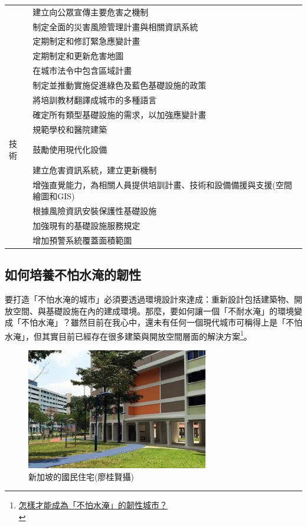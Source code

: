 \documentclass[a4paper,12pt]{article}
\begin{document}
\begin{center}
\begin{tabular}{ll}
 & 建立向公眾宣傳主要危害之機制\\
 & 制定全面的災害風險管理計畫與相關資訊系統\\
 & 定期制定和修訂緊急應變計畫\\
 & 定期制定和更新危害地圖\\
 & 在城市法令中包含區域計畫\\
 & 制定並推動實施促進綠色及藍色基礎設施的政策\\
 & 將培訓教材翻譯成城市的多種語言\\
 & 確定所有類型基礎設施的需求，以加強應變計畫\\
 & 規範學校和醫院建築\\
\hline
技術 & 鼓勵使用現代化設備\\
 & 建立危害資訊系統，建立更新機制\\
 & 增強直覺能力，為相關人員提供培訓計畫、技術和設備備援與支援(空間繪圖和GIS)\\
 & 根據風險資訊安裝保護性基礎設施\\
 & 加強現有的基礎設施服務規定\\
 & 增加預警系統覆蓋面積範圍\\
\hline
\end{tabular}
\end{center}

\subsection{如何培養不怕水淹的韌性}
\label{sec:org7403e1e}

要打造「不怕水淹的城市」必須要透過環境設計來達成：重新設計包括建築物、開放空間、與基礎設施在內的建成環境。那麼，要如何讓一個「不耐水淹」的環境變成「不怕水淹」？雖然目前在我心中，還未有任何一個現代城市可稱得上是「不怕水淹」，但其實目前已經存在很多建築與開放空間層面的解決方案\footnote{\href{https://opinion.udn.com/opinion/story/8048/2501992}{怎樣才能成為「不怕水淹」的韌性城市？}\\\label{org1ba0516}}。\\

\begin{figure}[htbp]
\centering
\includegraphics[width=300]{images/161236830052927_P3592718.jpg}
\caption{\label{fig:FigName}新加坡的國民住宅(廖桂賢攝)}
\end{figure}
\end{document}
